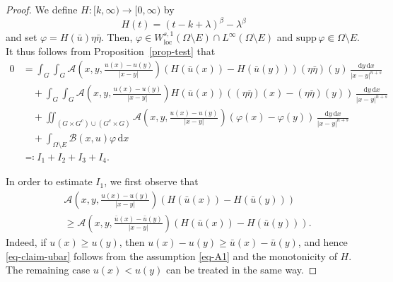\documentclass{amsart}
\theoremstyle{plain}
\theoremstyle{definition}
\numberwithin{equation}{section}
\begin{document}
\begin{proof}
We define $H: [k, \infty) \to [0, \infty)$ by
\begin{equation*}
H(t) = (t-k+\lambda)^\beta-\lambda^\beta
\end{equation*}
and set $\varphi=H(\bar{u}) \eta\bar{\eta}$. Then, $\varphi \in W^{s, 1}_{\mathrm{loc}}(\Omega \setminus E) \cap L^\infty(\Omega \setminus E)$ and $\mathrm{supp}\,\varphi \Subset \Omega \setminus E$. It thus follows from Proposition~\ref{prop-test} that
\begin{align*}
0
&= \int_{G} \int_{G} \mathscr{A} \left( x, y, \frac{u(x)-u(y)}{|x-y|} \right) (H(\bar{u}(x)) - H(\bar{u}(y))) (\eta\bar{\eta})(y) \, \frac{\mathrm{d}y \,\mathrm{d}x}{|x-y|^{n+s}} \\
&\quad + \int_{G} \int_{G} \mathscr{A} \left( x, y, \frac{u(x)-u(y)}{|x-y|} \right) H(\bar{u}(x)) ((\eta\bar{\eta})(x) - (\eta\bar{\eta})(y)) \, \frac{\mathrm{d}y \,\mathrm{d}x}{|x-y|^{n+s}} \\
&\quad + \iint_{(G \times G^c) \cup (G^c \times G)} \mathscr{A} \left( x, y, \frac{u(x)-u(y)}{|x-y|} \right) (\varphi(x)-\varphi(y)) \, \frac{\mathrm{d}y \,\mathrm{d}x}{|x-y|^{n+s}} \\
&\quad + \int_{\Omega \setminus E} \mathscr{B}(x, u)\varphi \,\mathrm{d}x \\
&\eqqcolon I_1 + I_2 + I_3 + I_4.
\end{align*}

In order to estimate $I_1$, we first observe that
\begin{equation}\label{eq-claim-ubar}
\begin{split}
&\mathscr{A} \left( x, y, \frac{u(x)-u(y)}{|x-y|} \right) (H(\bar{u}(x)) - H(\bar{u}(y))) \\
&\geq \mathscr{A} \left( x, y, \frac{\bar{u}(x)-\bar{u}(y)}{|x-y|} \right) (H(\bar{u}(x)) - H(\bar{u}(y))).
\end{split}
\end{equation}
Indeed, if $u(x) \geq u(y)$, then $u(x)-u(y) \geq \bar{u}(x)-\bar{u}(y)$, and hence \eqref{eq-claim-ubar} follows from the assumption \eqref{eq-A1} and the monotonicity of $H$. The remaining case $u(x) < u(y)$ can be treated in the same way.


\end{proof}
\end{document}
